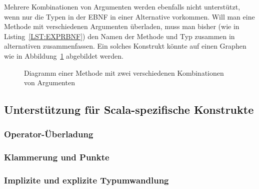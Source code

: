 \documentclass[../InterneDSLs.tex]{subfiles}
\begin{document}
Mehrere Kombinationen von Argumenten werden ebenfalls nicht unterstützt, wenn nur die Typen in der EBNF in einer Alternative vorkommen. Will man eine Methode mit verschiedenen Argumenten überladen, muss man bisher (wie in Listing~\ref{LST:EXPRBNF}) den Namen der Methode und Typ zusammen in alternativen zusammenfassen. Ein solches Konstrukt könnte auf einen Graphen wie in Abbildung~\ref{FIG:DiagramMethodTwoCombinationsArguments} abgebildet werden.
\begin{figure}[ht]
\centering
{}
\caption{Diagramm einer Methode mit zwei verschiedenen Kombinationen von Argumenten}
\label{FIG:DiagramMethodTwoCombinationsArguments}
\end{figure}


\subsection{Unterstützung für Scala-spezifische Konstrukte}
\subsubsection{Operator-Überladung}
\subsubsection{Klammerung und Punkte}
\subsubsection{Implizite und explizite Typumwandlung}
\end{document}
